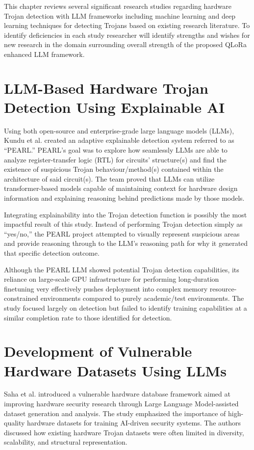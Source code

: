 \documentclass[12pt,a4paper]{report}
\begin{document}
This chapter reviews several significant research studies regarding hardware Trojan detection with LLM frameworks including machine learning and deep learning techniques for detecting Trojans based on existing research literature. To identify deficiencies in each study researcher will identify strengths and wishes for new research in the domain surrounding overall strength of the proposed QLoRa enhanced LLM framework.

\section{LLM-Based Hardware Trojan Detection Using Explainable AI}

Using both open-source and enterprise-grade large language models (LLMs), Kundu et al. created an adaptive explainable detection system referred to as “PEARL.” PEARL’s goal was to explore how seamlessly LLMs are able to analyze register-transfer logic (RTL) for circuits’ structure(s) and find the existence of suspicious Trojan behaviour/method(s) contained within the architecture of said circuit(s). The team proved that LLMs can utilize transformer-based models capable of maintaining context for hardware design information and explaining reasoning behind predictions made by those models.

Integrating explainability into the Trojan detection function is possibly the most impactful result of this study. Instead of performing Trojan detection simply as “yes/no,” the PEARL project attempted to visually represent suspicious areas and provide reasoning through to the LLM’s reasoning path for why it generated that specific detection outcome.

Although the PEARL LLM showed potential Trojan detection capabilities, its reliance on large-scale GPU infrastructure for performing long-duration finetuning very effectively pushes deployment into complex memory resource-constrained environments compared to purely academic/test environments. The study focused largely on detection but failed to identify training capabilities at a similar completion rate to those identified for detection.

\section{Development of Vulnerable Hardware Datasets Using LLMs}

Saha et al. introduced a vulnerable hardware database framework aimed at improving hardware security research through Large Language Model-assisted dataset generation and analysis. The study emphasized the importance of high-quality hardware datasets for training AI-driven security systems. The authors discussed how existing hardware Trojan datasets were often limited in diversity, scalability, and structural representation.
\end{document}
